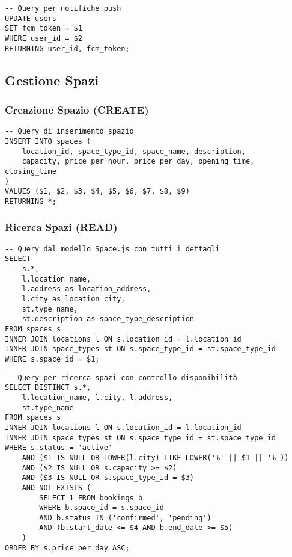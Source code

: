 \begin{lstlisting}[caption=Aggiornamento Token FCM]
-- Query per notifiche push
UPDATE users 
SET fcm_token = $1 
WHERE user_id = $2 
RETURNING user_id, fcm_token;
\end{lstlisting}

\subsection{Gestione Spazi}

\subsubsection{Creazione Spazio (CREATE)}
\begin{lstlisting}[caption=Creazione Spazio dal Modello Space.js]
-- Query di inserimento spazio
INSERT INTO spaces (
    location_id, space_type_id, space_name, description, 
    capacity, price_per_hour, price_per_day, opening_time, closing_time
)
VALUES ($1, $2, $3, $4, $5, $6, $7, $8, $9)
RETURNING *;
\end{lstlisting}

\newpage

\subsubsection{Ricerca Spazi (READ)}
\begin{lstlisting}[caption=Query Completa Spazi con JOIN]
-- Query dal modello Space.js con tutti i dettagli
SELECT 
    s.*,
    l.location_name,
    l.address as location_address,
    l.city as location_city,
    st.type_name,
    st.description as space_type_description
FROM spaces s
INNER JOIN locations l ON s.location_id = l.location_id
INNER JOIN space_types st ON s.space_type_id = st.space_type_id
WHERE s.space_id = $1;
\end{lstlisting}

\begin{lstlisting}[caption=Ricerca Spazi Disponibili con Filtri]
-- Query per ricerca spazi con controllo disponibilità
SELECT DISTINCT s.*,
    l.location_name, l.city, l.address,
    st.type_name
FROM spaces s
INNER JOIN locations l ON s.location_id = l.location_id
INNER JOIN space_types st ON s.space_type_id = st.space_type_id
WHERE s.status = 'active'
    AND ($1 IS NULL OR LOWER(l.city) LIKE LOWER('%' || $1 || '%'))
    AND ($2 IS NULL OR s.capacity >= $2)
    AND ($3 IS NULL OR s.space_type_id = $3)
    AND NOT EXISTS (
        SELECT 1 FROM bookings b
        WHERE b.space_id = s.space_id
        AND b.status IN ('confirmed', 'pending')
        AND (b.start_date <= $4 AND b.end_date >= $5)
    )
ORDER BY s.price_per_day ASC;
\end{lstlisting}

